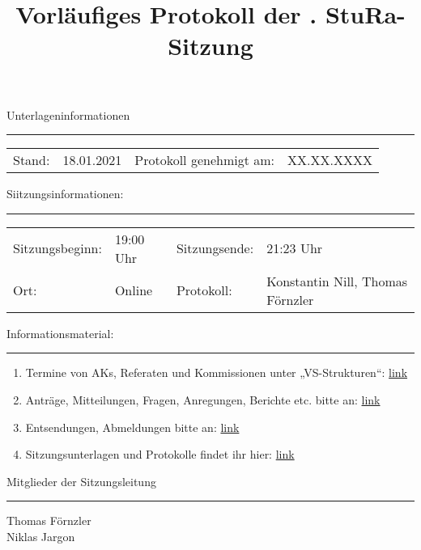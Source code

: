 \title{Vorläufiges Protokoll der \eventnumber . StuRa-Sitzung}
\author{}
\date{\vspace{-2em}\datum\vspace{-1em}}
\maketitle

Unterlageninformationen
\vspace{.5em}\hrule
\begin{center}
    \begin{tabular}{m{2cm}m{3cm}m{4cm}m{3cm}}
        Stand: & 18.01.2021 & Protokoll genehmigt am: & XX.XX.XXXX\\
    \end{tabular}
\end{center}

Siitzungsinformationen:
\vspace{.5em}\hrule
\begin{center}
    \begin{tabular}{m{3cm}m{3cm}m{3cm}m{3cm}}
        Sitzungsbeginn: & 19:00 Uhr & Sitzungsende: & 21:23 Uhr\\
        Ort: & Online & Protokoll: & Konstantin Nill, Thomas Förnzler \\
    \end{tabular}
\end{center}

Informationsmaterial:
\vspace{.5em}\hrule\vspace{.5em}
\begin{enumerate}
    \item Termine von AKs, Referaten und Kommissionen unter „VS-Strukturen“: \href{https://www.stura.uni-heidelberg.de}{link}
    \item Anträge, Mitteilungen, Fragen, Anregungen, Berichte etc. bitte an: \href{mailto:sitzungsleitung@stura.uni-heidelberg.de}{link}
    \item Entsendungen, Abmeldungen bitte an: \href{mailto:entsendung@stura.uni-heidelberg.de}{link}
    \item Sitzungsunterlagen und Protokolle findet ihr hier: \href{https://www.stura.uni-heidelberg.de/vs-strukturen/studierendenrat/protokolle-antraege-beschluesse-der-8-legislatur/}{link}
\end{enumerate}
\vspace{1.5em}

Mitglieder der Sitzungsleitung
\vspace{.5em}\hrule\vspace{.5em}
Thomas Förnzler\\
Niklas Jargon
\pagebreak 